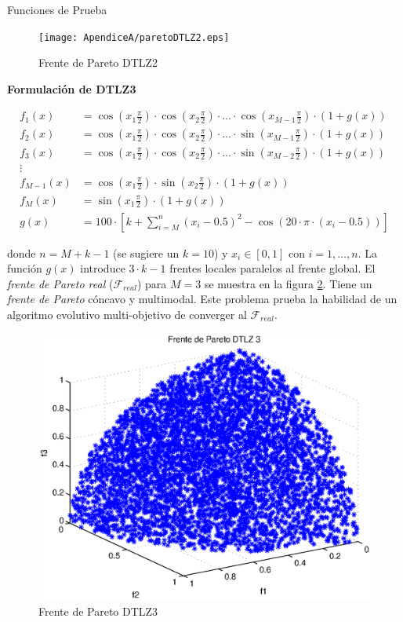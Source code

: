 \begin{chapter}{Funciones de Prueba}
\begin{figure}[h!]
 \centering
\texttt{[image: ApendiceA/paretoDTLZ2.eps]}
\caption{Frente de Pareto DTLZ2}
\label{fig:DTLZ2}
\end{figure}

\textbf{Formulaci\'on de DTLZ3}

\begin{align*}
f_1(x)&=\cos(x_1\frac{\pi}{2})\cdot\cos(x_2\frac{\pi}{2})\cdot\ldots\cdot \cos(x_{M-1}\frac{\pi}{2})\cdot(1+g(x))\\
f_2(x)&=\cos(x_1\frac{\pi}{2})\cdot\cos(x_2\frac{\pi}{2})\cdot\ldots\cdot \sin(x_{M-1}\frac{\pi}{2})\cdot(1+g(x))\\
f_3(x)&=\cos(x_1\frac{\pi}{2})\cdot\cos(x_2\frac{\pi}{2})\cdot\ldots\cdot \sin(x_{M-2}\frac{\pi}{2})\cdot(1+g(x))\\
\vdots&\\
f_{M-1}(x)&=\cos(x_1\frac{\pi}{2})\cdot\sin(x_2\frac{\pi}{2})\cdot(1+g(x))\\
f_{M}(x)&=\sin(x_1\frac{\pi}{2})\cdot (1+g(x))\\
g(x)&=100\cdot [k+\sum_{i=M}^n(x_i-0.5)^2-\cos(20\cdot\pi\cdot(x_i-0.5))]
\end{align*}


donde $n=M+k-1$ (se sugiere un $k=10$) y $x_i\in[0,1]$ con $i=1, \ldots, n$. La funci\'on $g(x)$ introduce  $3\cdot k-1$ frentes locales 
paralelos al frente global. El \textit{frente de Pareto real} ($\mathcal{F}_{real}$) para $M=3$ se muestra en la figura \ref{fig:DTLZ3}.
Tiene un {\it frente de Pareto}  c\'oncavo y multimodal. Este problema prueba la habilidad de un algoritmo evolutivo multi-objetivo de converger al 
$\mathcal{F}_{real}$.

\begin{figure}[h!]
 \centering
\includegraphics[scale=0.4]{ApendiceA/paretoDTLZ3.eps}
\caption{Frente de Pareto DTLZ3}
\label{fig:DTLZ3}
\end{figure}


\end{chapter}
